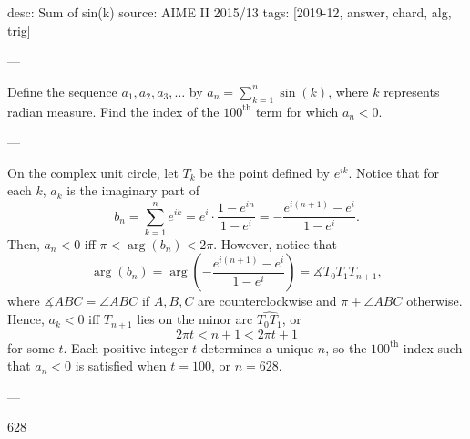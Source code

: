 desc: Sum of sin(k)
source: AIME II 2015/13
tags: [2019-12, answer, chard, alg, trig]

---

Define the sequence $a_1,a_2,a_3,\ldots$ by $a_n=\sum_{k=1}^n\sin(k)$, where $k$ represents radian measure. Find the index of the $100^\text{th}$ term for which $a_n<0$.

---

On the complex unit circle, let $T_k$ be the point defined by $e^{ik}$. Notice that for each $k$, $a_k$ is the imaginary part of \[b_n=\sum_{k=1}^n e^{ik}=e^i\cdot\frac{1-e^{in}}{1-e^i}=-\frac{e^{i(n+1)}-e^i}{1-e^i}.\]
Then, $a_n<0$ iff $\pi<\arg(b_n)<2\pi$. However, notice that \[\arg(b_n)=\arg\left(-\frac{e^{i(n+1)}-e^i}{1-e^i}\right)=\measuredangle T_0T_1T_{n+1},\]
where $\measuredangle ABC=\angle ABC$ if $A,B,C$ are counterclockwise and $\pi+\angle ABC$ otherwise. Hence, $a_k<0$ iff $T_{n+1}$ lies on the minor arc $\widehat{T_0T_1}$, or \[2\pi t<n+1<2\pi t+1\]
for some $t$. Each positive integer $t$ determines a unique $n$, so the $100^\text{th}$ index such that $a_n<0$ is satisfied when $t=100$, or $n=628$.

---

628
